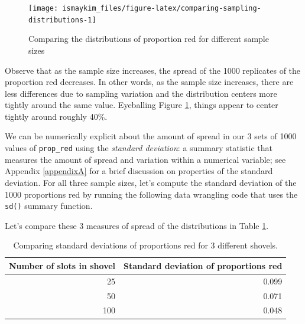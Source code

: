 \documentclass[12pt, krantz2,]{krantz}
\makeatletter
\newenvironment{Shaded}{\begin{snugshade}}{\end{snugshade}}
\newcommand{\CommentTok}[1]{\textcolor[rgb]{0.37,0.37,0.37}{\textit{#1}}}
\newcommand{\DataTypeTok}[1]{\textcolor[rgb]{0.27,0.27,0.27}{#1}}
\newcommand{\DecValTok}[1]{\textcolor[rgb]{0.06,0.06,0.06}{#1}}
\newcommand{\KeywordTok}[1]{\textcolor[rgb]{0.27,0.27,0.27}{\textbf{#1}}}
\newcommand{\NormalTok}[1]{#1}
\newcommand{\OperatorTok}[1]{\textcolor[rgb]{0.43,0.43,0.43}{\textbf{#1}}}
\newcommand{\StringTok}[1]{\textcolor[rgb]{0.5,0.5,0.5}{#1}}
\newenvironment{kframe}{%
\medskip{}
\setlength{\fboxsep}{.8em}
 \def\at@end@of@kframe{}%
 \ifinner\ifhmode%
  \def\at@end@of@kframe{\end{minipage}}%
  \begin{minipage}{\columnwidth}%
 \fi\fi%
 \def\FrameCommand##1{\hskip\@totalleftmargin \hskip-\fboxsep
 \colorbox{shadecolor}{##1}\hskip-\fboxsep
     \hskip-\linewidth \hskip-\@totalleftmargin \hskip\columnwidth}%
 \MakeFramed {\advance\hsize-\width
   \@totalleftmargin\z@ \linewidth\hsize
   \@setminipage}}%
 {\par\unskip\endMakeFramed%
 \at@end@of@kframe}
\renewenvironment{Shaded}{\begin{kframe}}{\end{kframe}}
\makeatother
\begin{document}
\begin{figure}

{\centering \texttt{[image: ismaykim\_files/figure-latex/comparing-sampling-distributions-1]} 

}

\caption{Comparing the distributions of proportion red for different sample sizes}\label{fig:comparing-sampling-distributions}
\end{figure}

Observe that as the sample size increases, the spread of the 1000 replicates of the proportion red decreases. In other words, as the sample size increases, there are less differences due to sampling variation and the distribution centers more tightly around the same value. Eyeballing Figure \ref{fig:comparing-sampling-distributions}, things appear to center tightly around roughly 40\%.

We can be numerically explicit about the amount of spread in our 3 sets of 1000 values of \texttt{prop\_red} using the \emph{standard deviation}: a summary statistic that measures the amount of spread and variation within a numerical variable; see Appendix \ref{appendixA} for a brief discussion on properties of the standard deviation. For all three sample sizes, let's compute the standard deviation of the 1000 proportions red by running the following data wrangling code that uses the \texttt{sd()} summary function.

\begin{Shaded}
\end{Shaded}

Let's compare these 3 measures of spread of the distributions in Table \ref{tab:comparing-n}.

\begin{table}[H]

\caption{\label{tab:comparing-n}Comparing standard deviations of proportions red for 3 different shovels.}
\centering
\fontsize{10}{12}\selectfont
\begin{tabular}{rr}
\toprule
Number of slots in shovel & Standard deviation of proportions red\\
\midrule
25 & 0.099\\
50 & 0.071\\
100 & 0.048\\
\bottomrule
\end{tabular}
\end{table}
\end{document}
